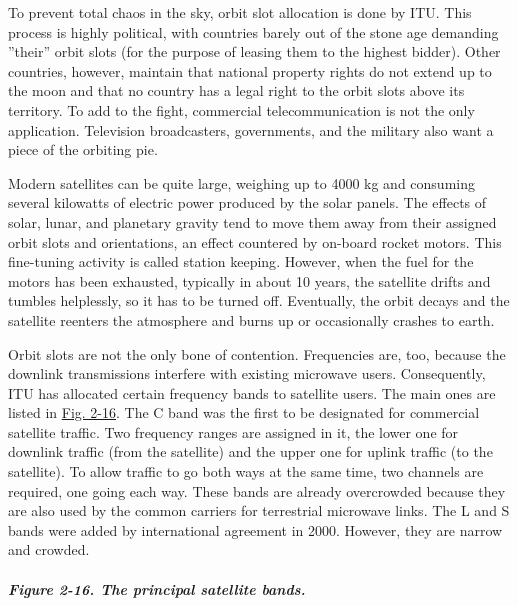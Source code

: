 \documentclass[b5paper,11pt]{memoir}
\begin{document}
To prevent total chaos in the sky, orbit slot allocation is done by ITU.
This process is highly political, with countries barely out of the stone
age demanding ''their'' orbit slots (for the purpose of leasing them to
the highest bidder). Other countries, however, maintain that national
property rights do not extend up to the moon and that no country has a
legal right to the orbit slots above its territory. To add to the fight,
commercial telecommunication is not the only application. Television
broadcasters, governments, and the military also want a piece of the
orbiting pie.

Modern satellites can be quite large, weighing up to 4000 kg and
consuming several kilowatts of electric power produced by the solar
panels. The effects of solar, lunar, and planetary gravity tend to move
them away from their assigned orbit slots and orientations, an effect
countered by on-board rocket motors. This fine-tuning activity is called
{station keeping}. However, when the fuel for the motors has been
exhausted, typically in about 10 years, the satellite drifts and tumbles
helplessly, so it has to be turned off. Eventually, the orbit decays and
the satellite reenters the atmosphere and burns up or occasionally
crashes to earth.

Orbit slots are not the only bone of contention. Frequencies are, too,
because the downlink transmissions interfere with existing microwave
users. Consequently, ITU has allocated certain frequency bands to
satellite users. The main ones are listed in
\protect\hyperlink{0130661023_ch02lev1sec4.htmlux5cux23ch02fig16}{Fig.
2-16}. The C band was the first to be designated for commercial
satellite traffic. Two frequency ranges are assigned in it, the lower
one for downlink traffic (from the satellite) and the upper one for
uplink traffic (to the satellite). To allow traffic to go both ways at
the same time, two channels are required, one going each way. These
bands are already overcrowded because they are also used by the common
carriers for terrestrial microwave links. The L and S bands were added
by international agreement in 2000. However, they are narrow and
crowded.

\subparagraph[Figure 2-16. The principal satellite
bands.]{\texorpdfstring{\protect\hypertarget{0130661023_ch02lev1sec4.htmlux5cux23ch02fig16}{}{}Figure
2-16. The principal satellite
bands.}{Figure 2-16. The principal satellite bands.}}

\end{document}
